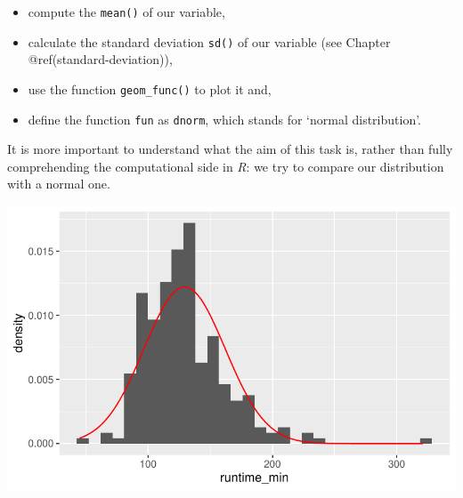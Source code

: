 \documentclass[
  letterpaper,
]{krantz}
\makeatletter
\newenvironment{Shaded}{\begin{snugshade}}{\end{snugshade}}
\newcommand{\AttributeTok}[1]{\textcolor[rgb]{0.40,0.45,0.13}{#1}}
\newcommand{\CommentTok}[1]{\textcolor[rgb]{0.37,0.37,0.37}{#1}}
\newcommand{\DecValTok}[1]{\textcolor[rgb]{0.68,0.00,0.00}{#1}}
\newcommand{\FunctionTok}[1]{\textcolor[rgb]{0.28,0.35,0.67}{#1}}
\newcommand{\NormalTok}[1]{\textcolor[rgb]{0.00,0.23,0.31}{#1}}
\newcommand{\SpecialCharTok}[1]{\textcolor[rgb]{0.37,0.37,0.37}{#1}}
\newcommand{\StringTok}[1]{\textcolor[rgb]{0.13,0.47,0.30}{#1}}
\newenvironment{kframe}{%
\medskip{}
\setlength{\fboxsep}{.8em}
 \def\at@end@of@kframe{}%
 \ifinner\ifhmode%
  \def\at@end@of@kframe{\end{minipage}}%
  \begin{minipage}{\columnwidth}%
 \fi\fi%
 \def\FrameCommand##1{\hskip\@totalleftmargin \hskip-\fboxsep
 \colorbox{shadecolor}{##1}\hskip-\fboxsep
     \hskip-\linewidth \hskip-\@totalleftmargin \hskip\columnwidth}%
 \MakeFramed {\advance\hsize-\width
   \@totalleftmargin\z@ \linewidth\hsize
   \@setminipage}}%
 {\par\unskip\endMakeFramed%
 \at@end@of@kframe}
\renewenvironment{Shaded}{\begin{kframe}}{\end{kframe}}
\makeatother
\begin{document}
\begin{itemize}
\item
  compute the \texttt{mean()} of our variable,
\item
  calculate the standard deviation \texttt{sd()} of our variable (see
  Chapter @ref(standard-deviation)),
\item
  use the function \texttt{geom\_func()} to plot it and,
\item
  define the function \texttt{fun} as \texttt{dnorm}, which stands for
  `normal distribution'.
\end{itemize}

It is more important to understand what the aim of this task is, rather
than fully comprehending the computational side in \emph{R}: we try to
compare our distribution with a normal one.

\begin{Shaded}
\end{Shaded}

\includegraphics{08_descriptive_statistics_files/figure-pdf/compare-normal-distribution-to-our-data-1.pdf}
\end{document}
